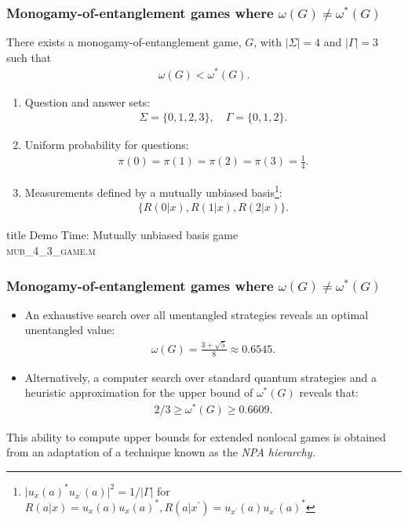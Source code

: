 \documentclass{beamer}
\newcommand{\abs}[1]{\lvert #1 \rvert}
\begin{document}
\begin{frame}
	\frametitle{Monogamy-of-entanglement games where $\omega(G) \not= \omega^*(G)$}
		There exists a monogamy-of-entanglement game, $G$, with $\abs{\Sigma} = 4$ and $\abs{\Gamma} = 3$ such that 
		\begin{align*}
			\omega(G) < \omega^*(G). 
		\end{align*}
	\begin{enumerate}
		\item Question and answer sets:
			\begin{align*}
				\Sigma = \{0,1,2,3\}, \quad \Gamma = \{0,1,2\}.
			\end{align*}
		\item Uniform probability for questions:
			\begin{align*}
				\pi(0) = \pi(1) = \pi(2) = \pi(3) = \frac{1}{4}.
			\end{align*}
		\item Measurements defined by a mutually unbiased basis\footnote{$\abs{u_x(a)^* u_{x^{\prime}}(a)}^2 = 1/\abs{\Gamma}$ for $R(a|x) = u_x(a) u_x(a)^*, R(a|x^{\prime}) = u_{x^{\prime}}(a) u_{x^{\prime}}(a)^*$}:
			\begin{align*}
				\{ R(0|x), R(1|x), R(2|x) \}.
			\end{align*}
	\end{enumerate}
\end{frame}

\begin{frame} [noframenumbering]
  \vfill
  \centering
  \begin{beamercolorbox}[sep=8pt,center,shadow=true,rounded=true]{title}
    Demo Time: Mutually unbiased basis game \\ \textsc{mub\_4\_3\_game.m}
  \end{beamercolorbox}
  \vfill
\end{frame}

\begin{frame}
	\frametitle{Monogamy-of-entanglement games where $\omega(G) \not= \omega^*(G)$}
	\begin{itemize}
	\item An exhaustive search over all unentangled strategies reveals an optimal unentangled value:
	\begin{align*}
		\omega(G) = \frac{3 + \sqrt{5}}{8} \approx 0.6545. 
	\end{align*}
	\item Alternatively, a computer search over standard quantum strategies and a heuristic approximation for the upper bound of $\omega^*(G)$ reveals that: 
	\begin{align*}
		2/3 \geq \omega^*(G) \geq 0.6609.
	\end{align*}
	\end{itemize}
This ability to compute upper bounds for extended nonlocal games is obtained from an adaptation of a technique known as the \emph{NPA hierarchy.}
\end{frame}
\end{document}
